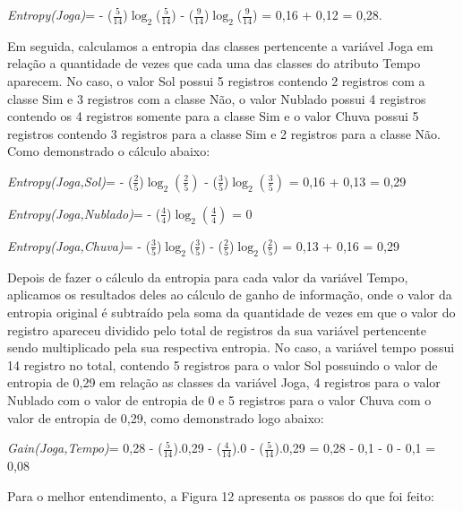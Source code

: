 \textit{Entropy(Joga)}={ - ($\frac{5}{14}$)$\log_{2}$($\frac{5}{14}$) - ($\frac{9}{14}$)$\log_{2}$($\frac{9}{14}$) = 0,16 + 0,12 = 0,28.}

\par
Em seguida, calculamos a entropia das classes pertencente a variável Joga em relação a quantidade de vezes que cada uma das classes do atributo Tempo aparecem. No caso, o valor Sol possui 5 registros contendo 2 registros com a classe Sim e 3 registros com a classe Não, o valor Nublado possui 4 registros contendo os 4 registros somente para a classe Sim e o valor Chuva possui 5 registros contendo 3 registros para a classe Sim e 2 registros para a classe Não. Como demonstrado o cálculo abaixo:

\textit{Entropy(Joga,Sol)}={ - ($\frac{2}{5}$)$\log_{2}(\frac{2}{5})$ - ($\frac{3}{5}$)$\log_{2}(\frac{3}{5})$ = 0,16 + 0,13 = 0,29}

\textit{Entropy(Joga,Nublado)}={ - ($\frac{4}{4}$)$\log_{2}(\frac{4}{4})$ = 0}

\textit{Entropy(Joga,Chuva)}={ - ($\frac{3}{5}$)$\log_{2}$($\frac{3}{5}$) - ($\frac{2}{5}$)$\log_{2}$($\frac{2}{5}$) = 0,13 + 0,16 = 0,29} 

\par
Depois de fazer o cálculo da entropia para cada valor da variável Tempo, aplicamos os resultados deles ao cálculo de ganho de informação, onde o valor da entropia original é subtraído pela soma da quantidade de vezes em que o valor do registro apareceu dividido pelo total de registros da sua variável pertencente sendo multiplicado pela sua respectiva entropia. No caso, a variável tempo possui 14 registro no total, contendo 5 registros para o valor Sol possuindo o valor de entropia de 0,29 em relação as classes da variável Joga, 4 registros para o valor Nublado com o valor de entropia de 0 e 5 registros para o valor Chuva com o valor de entropia de 0,29, como demonstrado logo abaixo:

\textit{Gain(Joga,Tempo)}={ 0,28 - ($\frac{5}{14}$).0,29 - ($\frac{4}{14}$).0 - ($\frac{5}{14}$).0,29 = 0,28 - 0,1 - 0 - 0,1 = 0,08} 

\par
Para o melhor entendimento, a Figura 12 apresenta os passos do que foi feito:

